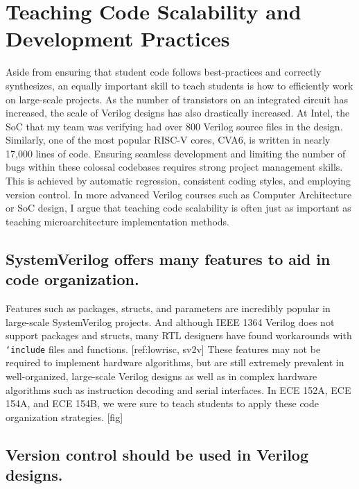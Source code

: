 
\chapter{Teaching Code Scalability and Development Practices}
\label{chapter:scalability}

Aside from ensuring that student code follows best-practices and correctly synthesizes, an equally important skill to teach students is how to efficiently work on large-scale projects. As the number of transistors on an integrated circuit has increased, the scale of Verilog designs has also drastically increased. At Intel, the SoC that my team was verifying had over 800 Verilog source files in the design. Similarly, one of the most popular RISC-V cores, CVA6, is written in nearly 17,000 lines of code. Ensuring seamless development and limiting the number of bugs within these colossal codebases requires strong project management skills. This is achieved by automatic regression, consistent coding styles, and employing version control. In more advanced Verilog courses such as Computer Architecture or SoC design, I argue that teaching code scalability is often just as important as teaching microarchitecture implementation methods.

\section{SystemVerilog offers many features to aid in code organization.}

Features such as packages, structs, and parameters are incredibly popular in large-scale SystemVerilog projects. And although IEEE 1364 Verilog does not support packages and structs, many RTL designers have found workarounds with \texttt{`include} files and functions. [ref:lowrisc, sv2v] These features may not be required to implement hardware algorithms, but are still extremely prevalent in well-organized, large-scale Verilog designs as well as in complex hardware algorithms such as instruction decoding and serial interfaces. In ECE 152A, ECE 154A, and ECE 154B, we were sure to teach students to apply these code organization strategies. [fig]

\section{Version control should be used in Verilog designs.}

